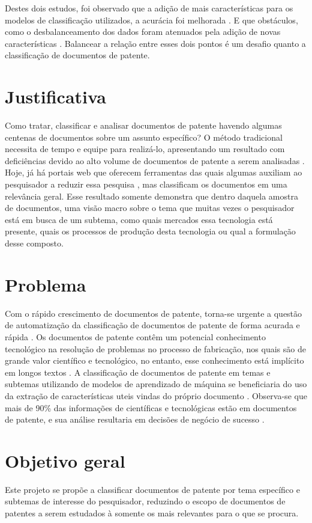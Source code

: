 Destes dois estudos, foi observado que a adição de mais características para os modelos de classificação utilizados, a acurácia foi melhorada \cite{shahid2020}. E que obstáculos, como o desbalanceamento dos dados foram atenuados pela adição de novas características \cite{Anne2017}. Balancear a relação entre esses dois pontos é um desafio quanto a classificação de documentos de patente.

\section{Justificativa}
Como tratar, classificar e analisar documentos de patente havendo algumas centenas de documentos sobre um assunto específico? O método tradicional necessita de tempo e equipe para realizá-lo, apresentando um resultado com deficiências devido ao alto volume de documentos de patente a serem analisadas \cite{Li2018}. Hoje, já há portais web que oferecem ferramentas das quais algumas auxiliam ao pesquisador a reduzir essa pesquisa \cite{Abbas2014}, mas classificam os documentos em uma relevância geral. Esse resultado somente demonstra que dentro daquela amostra de documentos, uma visão macro sobre o tema que muitas vezes o pesquisador está em busca de um subtema, como quais mercados essa tecnologia está presente, quais os processos de produção desta tecnologia ou qual a formulação desse composto. 

\section{Problema}
Com o rápido crescimento de documentos de patente, torna-se urgente a questão de automatização da classificação de documentos de patente de forma acurada e rápida \cite{Zhu2020}. Os documentos de patente contêm um potencial conhecimento tecnológico na resolução de problemas no processo de fabricação, nos quais são de grande valor científico e tecnológico, no entanto, esse conhecimento está implícito em longos textos \cite{Li2018, Wang2016}. A classificação de documentos de patente em temas e subtemas utilizando de modelos de aprendizado  de máquina se beneficiaria do uso da extração de características uteis vindas do próprio documento \cite{Anne2017}. Observa-se que mais de 90\% das informações de científicas e tecnológicas estão em documentos de patente, e sua análise resultaria em decisões de negócio de sucesso \cite{Li2018}.

\section{Objetivo geral}
Este projeto se propõe a classificar documentos de patente por tema específico e subtemas de interesse do pesquisador, reduzindo o escopo de documentos de patentes a serem estudados à somente os mais relevantes para o que se procura.

